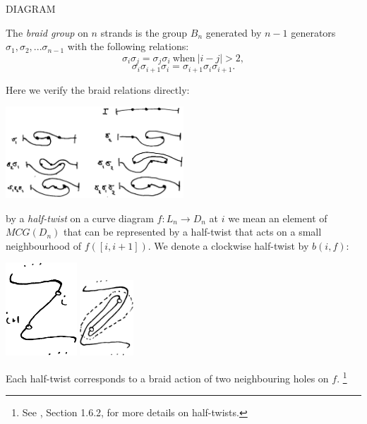 \documentclass[12pt,a4paper]{article}
\begin{document}
DIAGRAM

The {\it braid group} on $n$ strands is the group $B_n$ generated by $n-1$ generators
$\sigma_1, \sigma_2, ... \sigma_{n-1}$ with the following relations:
    $$ \sigma_i \sigma_j = \sigma_j \sigma_i \ \text{when}\ |i-j| > 2, $$
    $$ \sigma_i \sigma_{i+1} \sigma_i =  \sigma_{i+1} \sigma_i \sigma_{i+1}.$$


Here we verify the braid relations directly:

\begin{center}
\includegraphics[width=0.5\textwidth]{curve-braid.eps}
\end{center}


 by a {\it half-twist} on a curve
diagram $f:L_n\to D_n$ at $i$ we mean an element of $MCG(D_n)$
that can be represented by a half-twist that acts
on a small neighbourhood of $f([i, i+1]).$
We denote a clockwise half-twist by $b(i, f):$

\begin{center}
\includegraphics[width=0.2\textwidth]{halftwist-1.eps}
\includegraphics[width=0.15\textwidth]{halftwist-2.eps}
\end{center}

Each half-twist corresponds to a braid action of two neighbouring
holes on $f$.
\footnote{See \cite{Kassel10}, Section 1.6.2, for more details on half-twists.}

\end{document}
